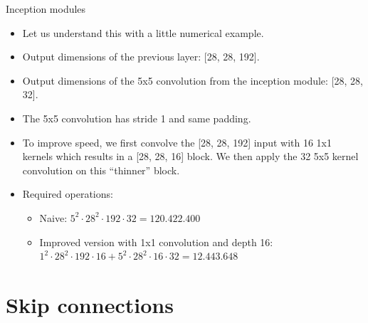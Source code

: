 \begin{vbframe}{Inception modules}
    \begin{itemize}
        \item Let us understand this with a little numerical example.
        \item Output dimensions of the previous layer: [28, 28, 192].
        \item Output dimensions of the 5x5 convolution from the inception module: [28, 28, 32].
        \item The 5x5 convolution has stride 1 and same padding.
        \item To improve speed, we first convolve the [28, 28, 192] input with 16 1x1 kernels which results in a [28, 28, 16] block. We then apply the 32 5x5 kernel convolution on this \enquote{thinner} block.
        \item Required operations:
        \begin{itemize}
            \item Naive: $5^2 \cdot 28^2 \cdot 192 \cdot 32 = 120.422.400$
            \item Improved version with 1x1 convolution and depth 16: $1^2 \cdot 28^2 \cdot 192 \cdot 16 + 5^2 \cdot 28^2 \cdot 16 \cdot 32 = 12.443.648$
        \end{itemize}
    \end{itemize}
\end{vbframe}





\section{Skip connections}

